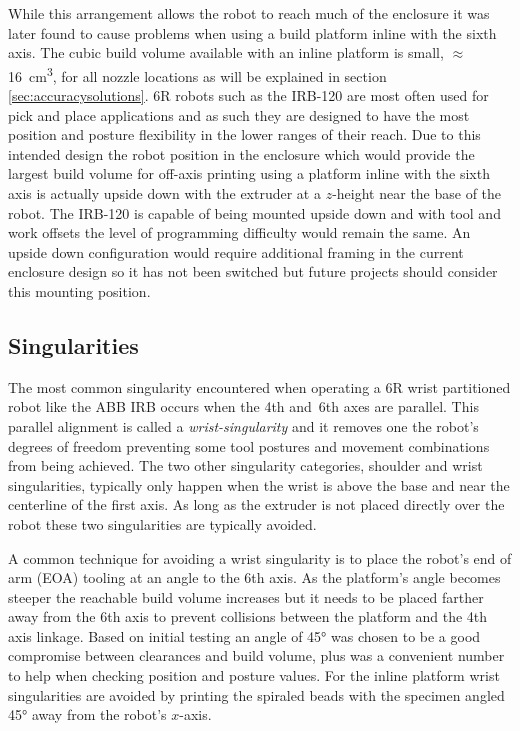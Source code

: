 \documentclass[main.tex]{subfiles}
\begin{document}
While this arrangement allows the robot to reach much of the enclosure it was later found to cause problems when using a build platform inline with the sixth axis.
The cubic build volume available with an inline platform is small, $\approx$ \SI{16}{cm^3}, for all nozzle locations as will be explained in section \ref{sec:accuracysolutions}.
6R robots such as the IRB-120 are most often used for pick and place applications and as such they are designed to have the most position and posture flexibility in the lower ranges of their reach.
Due to this intended design the robot position in the enclosure which would provide the largest build volume for off-axis printing using a platform inline with the sixth axis is actually upside down with the extruder at a $z$\nobreakdash-height near the base of the robot.
The IRB-120 is capable of being mounted upside down and with tool and work offsets the level of programming difficulty would remain the same.
An upside down configuration would require additional framing in the current enclosure design so it has not been switched but future projects should consider this mounting position.

\subsection{Singularities}
\label{sec:singularity}
The most common singularity encountered when operating a 6R wrist partitioned robot like the ABB IRB occurs when the 4th and~6th axes are parallel.
This parallel alignment is called a \emph{wrist-singularity} \cite{Hayes2002} and it removes one the robot's degrees of freedom preventing some tool postures and movement combinations from being achieved.
The two other singularity categories, shoulder and wrist singularities, typically only happen when the wrist is above the base and near the centerline of the first axis.
As long as the extruder is not placed directly over the robot these two singularities are typically avoided.

A common technique for avoiding a wrist singularity is to place the robot's end of arm (EOA)
tooling at an angle to the 6th axis.
As the platform's angle becomes steeper the reachable build volume increases but it needs to be placed farther away from the 6th axis to prevent collisions between the platform and the 4th axis linkage.
Based on initial testing an angle of \ang{45} was chosen to be a good compromise between clearances and build volume, plus was a convenient number to help when checking position and posture values.
For the inline platform wrist singularities are avoided by printing the spiraled beads with the specimen angled \ang{45} away from the robot's $x$\nobreakdash-axis.
\end{document}
